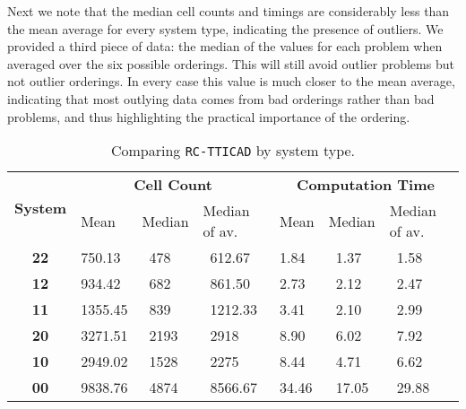 \documentclass[runningheads,a4paper]{llncs}
\begin{document}
Next we note that the median cell counts and timings are considerably less than the mean average for every system type, indicating the presence of outliers.  We provided a third piece of data: the median of the values for each problem when averaged over the six possible orderings.  This will still avoid outlier problems but not outlier orderings.  In every case this value is much closer to the mean average, indicating that most outlying data comes from bad orderings rather than bad problems, and thus highlighting the practical importance of the ordering.

\begin{table}
\vspace*{-10pt}
\caption{Comparing \texttt{RC-TTICAD} by system type.}
\label{tab:All}
\centering
\begin{tabular}{cllllll}
\multirow{2}{*}{\textbf{System}} & \multicolumn{3}{c}{\textbf{Cell Count}} & \multicolumn{3}{c}{\textbf{Computation Time}} \\ 
\cmidrule(lr){2-4}
\cmidrule(lr){5-7}
           & Mean  & Median     & Median of av. & Mean & Median & Median of av. \\
\midrule 
\textbf{22} & 750.13  & \, 478    & \, 612.67            & 1.84    & \, 1.37   & \, 1.58 \\
\textbf{12} & 934.42  & \, 682    & \, 861.50            & 2.73    & \, 2.12   & \, 2.47 \\
\textbf{11} & 1355.45 & \, 839    & \, 1212.33           & 3.41    & \, 2.10   & \, 2.99 \\
\textbf{20} & 3271.51 & \, 2193   & \, 2918              & 8.90    & \, 6.02   & \, 7.92 \\
\textbf{10} & 2949.02 & \, 1528   & \, 2275              & 8.44    & \, 4.71   & \, 6.62 \\
\textbf{00} & 9838.76 & \, 4874   & \, 8566.67           & 34.46   & \, 17.05  & \, 29.88 
\end{tabular}
\vspace*{-15pt}
\end{table} 
\end{document}
